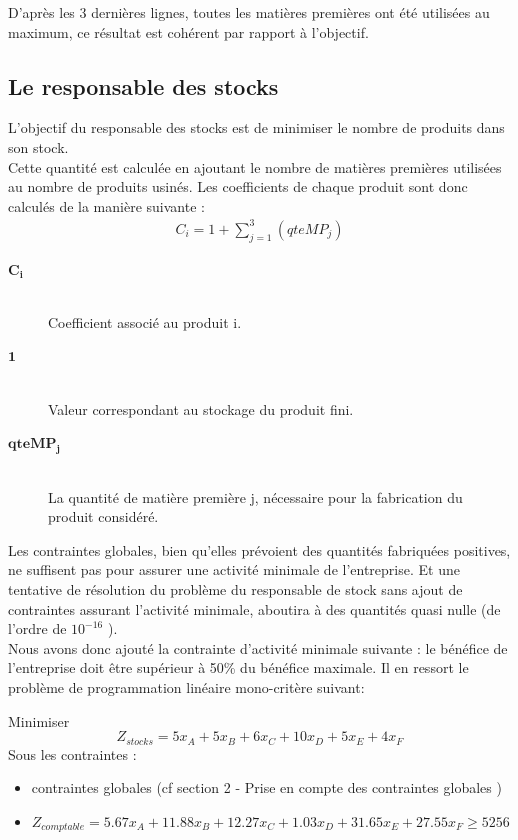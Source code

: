 \documentclass[12pt]{article}
\begin{document}
D'après les 3 dernières lignes, toutes les matières premières ont été utilisées au maximum, ce résultat est cohérent par rapport à l'objectif.
\subsection{Le responsable des stocks}
L'objectif du responsable des stocks est de minimiser le nombre de produits dans son stock. \\
Cette quantité est calculée en ajoutant le nombre de matières premières utilisées au nombre de produits usinés. Les coefficients de chaque produit sont donc calculés de la manière suivante : 
\begin{align*} C_{i} = 1 +  \sum_{j=1}^{3}(qteMP_{j}) 
\end{align*}
\begin{description}
\item[$\mathbf{C_{i}}$]\hfill\\Coefficient associé au produit i.
\item[$\mathbf{1}$]\hfill\\ Valeur correspondant au stockage du produit fini.
\item[$\mathbf{qteMP_{j}}$]\hfill\\La quantité de matière première j, nécessaire pour la fabrication du produit considéré.
\end{description}
Les contraintes globales, bien qu'elles prévoient des quantités fabriquées positives, ne suffisent pas pour assurer une activité minimale de l'entreprise. Et une tentative de résolution du problème du responsable de stock sans ajout de contraintes assurant l'activité minimale, aboutira à des quantités quasi nulle (de l'ordre de $ 10 ^{-16}$ ).\\
Nous avons donc ajouté la contrainte d'activité minimale suivante : le bénéfice de l'entreprise doit être supérieur à 50\% du bénéfice maximale. 
Il en ressort le problème de programmation linéaire mono-critère suivant:
\begin{tcolorbox}
Minimiser
\begin{equation*}
 Z_{stocks}= 5x_{A} + 5x_{B} + 6x_{C} + 10x_{D} + 5x_{E} + 4x_{F}
\end{equation*}
Sous les contraintes :
\begin{itemize}
\item contraintes globales (cf section 2 - Prise en compte des contraintes globales )
\item $Z_{comptable}= 5.67x_{A} +11.88x_{B} +12.27x_{C} +1.03x_{D} +31.65x_{E} +27.55x_{F} \geq 5256$
\end{itemize}
\end{tcolorbox}
\end{document}
